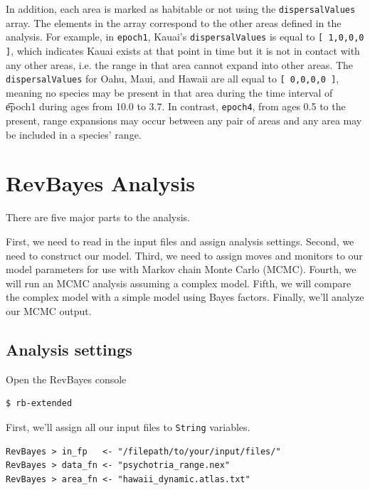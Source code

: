 \documentclass[11pt]{article}
\begin{document}
In addition, each area is marked as habitable or not using the {\tt dispersalValues} array.
The elements in the array correspond to the other areas defined in the analysis.
For example, in {\tt epoch1}, Kauai's {\tt dispersalValues} is equal to {\tt [ 1,0,0,0 ]}, which indicates Kauai exists at that point in time but it is not in contact with any other areas, i.e. the range in that area cannot expand into other areas.
The {\tt dispersalValues} for Oahu, Maui, and Hawaii are all equal to {\tt [ 0,0,0,0 ]}, meaning no species may be present in that area during the time interval of {\t epoch1} during ages from 10.0 to 3.7. In contrast, {\tt epoch4}, from ages 0.5 to the present, range expansions may occur between any pair of areas and any area may be included in a species' range.

\section{RevBayes Analysis}

There are five major parts to the analysis.

First, we need to read in the input files and assign analysis settings.
Second, we need to construct our model.
Third, we need to assign moves and monitors to our model parameters for use with Markov chain Monte Carlo (MCMC).
Fourth, we will run an MCMC analysis assuming a complex model.
Fifth, we will compare the complex model with a simple model using Bayes factors.
Finally, we'll analyze our MCMC output.

\subsection{Analysis settings}

\setlength{\parindent}{0pt}

Open the RevBayes console

\begin{snugshade}
\begin{lstlisting}
$ rb-extended
\end{lstlisting}
\end{snugshade}

First, we'll assign all our input files to {\tt String} variables.
\begin{snugshade}
\begin{lstlisting}
RevBayes > in_fp   <- "/filepath/to/your/input/files/"
RevBayes > data_fn <- "psychotria_range.nex"
RevBayes > area_fn <- "hawaii_dynamic.atlas.txt"
\end{lstlisting}
\end{snugshade}
\end{document}
